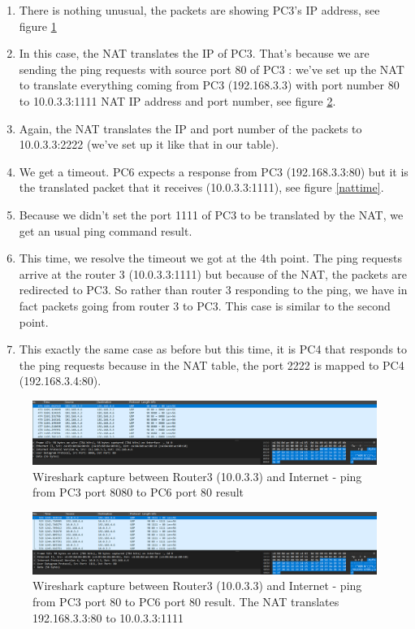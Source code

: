 \documentclass[10pt,a4paper]{ULBreport}
\begin{document}
\begin{enumerate}
    \item There is nothing unusual, the packets are showing PC3's IP address, see figure \ref{nat8080}
    \item In this case, the NAT translates the IP of PC3. That's because we are sending the ping requests with source port 80 of PC3 : we've set up the NAT to translate everything coming from PC3 (192.168.3.3) with port number 80 to 10.0.3.3:1111 NAT IP address and port number, see figure \ref{nat80}.
    \item Again, the NAT translates the IP and port number of the packets to 10.0.3.3:2222 (we've set up it like that in our table).
    \item We get a timeout. PC6 expects a response from PC3 (192.168.3.3:80) but it is the translated packet that it receives (10.0.3.3:1111), see figure \ref{nattime}.
    \item Because we didn't set the port 1111 of PC3 to be translated by the NAT, we get an usual ping command result.
    \item This time, we resolve the timeout we got at the 4th point. The ping requests arrive at the router 3 (10.0.3.3:1111) but because of the NAT, the packets are redirected to PC3. So rather than router 3 responding to the ping, we have in fact packets going from router 3 to PC3. This case is similar to the second point.
    \item This exactly the same case as before but this time, it is PC4 that responds to the ping requests because in the NAT table, the port 2222 is mapped to PC4 (192.168.3.4:80).
\end{enumerate}


\begin{figure}[H]
    \centering
    \includegraphics[width=\textwidth]{nat8080.png}
    \caption{Wireshark capture between Router3 (10.0.3.3) and Internet - ping from PC3 port 8080 to PC6 port 80 result}
    \label{nat8080}
\end{figure}

\begin{figure}[H]
    \centering
    \includegraphics[width=\textwidth]{nat80.png}
    \caption{Wireshark capture between Router3 (10.0.3.3) and Internet - ping from PC3 port 80 to PC6 port 80 result. The NAT translates 192.168.3.3:80 to 10.0.3.3:1111}
    \label{nat80}
\end{figure}
\end{document}
